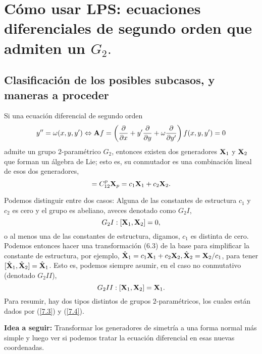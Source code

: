 \chapter{Cómo usar LPS: ecuaciones diferenciales de segundo orden que admiten un $G_2.$}
    \section{Clasificación de los posibles subcasos, y maneras a proceder}
    Si una ecuación diferencial de segundo orden
    \begin{equation}
    	y''=\omega(x,y,y')\Leftrightarrow \vb{A}f=\left(\pdv{x}+y'\pdv{y}+\omega\pdv{y'}\right)f(x,y,y')=0
    \end{equation}
    admite un grupo $2$-paramétrico $G_2$, entonces existen dos generadores $\vb{X}_1$ y $\vb{X}_2$ que forman un álgebra de Lie; esto es, su conmutador es una combinación lineal de esos dos generadores,
    \begin{equation}
    	[\vb{X}_1,\vb{X}_2]=C^p_{12}\vb{X}_p=c_1\vb{X}_1+c_2\vb{X}_2.
    \end{equation}
    
    Podemos distinguir entre dos casos: Alguna de las constantes de estructura $c_1$ y $c_2$ es cero y el grupo es abeliano, aveces denotado como $G_2I$,
    \begin{equation}\label{7.3}
    	G_2I: [\vb{X}_1,\vb{X}_2]=0,
    \end{equation}
    o al menos una de las constantes de estructura, digamos, $c_1$ es distinta de cero. Podemos entonces hacer una transformación (6.3) de la base para simplificar la constante de estructura, por ejemplo, $\hat{\vb{X}}_1=c_1\vb{X}_1+c_2\vb{X}_2, \hat{\vb{X}}_2=\vb{X}_2/c_1$, para tener $[\hat{\vb{X}}_1,\hat{\vb{X}}_2]=\hat{\vb{X}}_1$. Esto es, podemos siempre asumir, en el caso no conmutativo (denotado $G_2II$),
    \begin{equation}\label{7.4}
    	G_2II: [\vb{X}_1,\vb{X}_2]=\vb{X}_1.
    \end{equation}
    Para resumir,  hay dos tipos distintos de grupos $2$-paramétricos, los cuales están dados por (\ref{7.3})  y (\ref{7.4}).
    
    \textbf{Idea a seguir:} Transformar los generadores de simetría a una forma normal más simple y luego ver si podemos tratar la ecuación diferencial en esas nuevas coordenadas.
    
